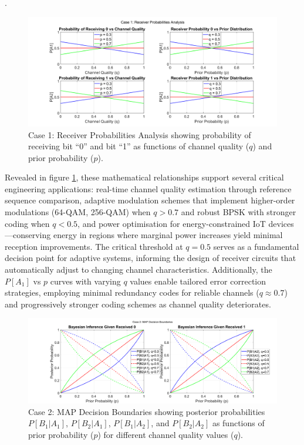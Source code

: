 .\documentclass[a4paper,11pt]{article}
\begin{document}
\begin{figure}[H]
    \centering
    \includegraphics[width=\textwidth]{photo/BSC_Analysis_Case1.png}
    \caption{Case 1: Receiver Probabilities Analysis showing probability of receiving bit ``0'' and bit ``1'' as functions of channel quality ($q$) and prior probability ($p$).}
    \label{fig:case1}
\end{figure}
\vspace{-10pt}
Revealed in figure \ref{fig:case1}, these mathematical relationships support several critical engineering applications: real-time channel quality estimation through reference sequence comparison, adaptive modulation schemes that implement higher-order modulations (64-QAM, 256-QAM) when \( q > 0.7 \) and robust BPSK with stronger coding when \( q < 0.5 \), and power optimisation for energy-constrained IoT devices—conserving energy in regions where marginal power increases yield minimal reception improvements. The critical threshold at \( q = 0.5 \) serves as a fundamental decision point for adaptive systems, informing the design of receiver circuits that automatically adjust to changing channel characteristics. Additionally, the \( P[A_1] \) vs \( p \) curves with varying \( q \) values enable tailored error correction strategies, employing minimal redundancy codes for reliable channels (\( q \approx 0.7 \)) and progressively stronger coding schemes as channel quality deteriorates.
\begin{figure}[H]
    \centering
    \includegraphics[width=\textwidth]{photo/BSC_Analysis_Case2.png}
    \caption{Case 2: MAP Decision Boundaries showing posterior probabilities $P[B_1|A_1]$, $P[B_2|A_1]$, $P[B_1|A_2]$, and $P[B_2|A_2]$ as functions of prior probability ($p$) for different channel quality values ($q$).}
    \label{fig:case2}
\end{figure}
\end{document}
